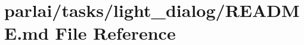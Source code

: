 \hypertarget{parlai_2tasks_2light__dialog_2README_8md}{}\section{parlai/tasks/light\+\_\+dialog/\+R\+E\+A\+D\+ME.md File Reference}
\label{parlai_2tasks_2light__dialog_2README_8md}
